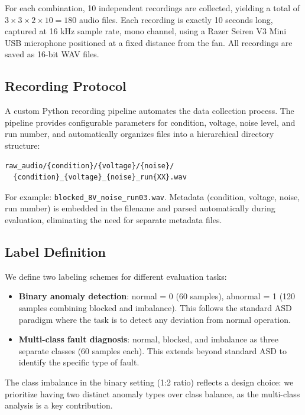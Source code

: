 \documentclass[sigconf]{acmart}
\begin{document}
For each combination, 10 independent recordings are collected, yielding a total of $3 \times 3 \times 2 \times 10 = 180$ audio files. Each recording is exactly 10 seconds long, captured at 16 kHz sample rate, mono channel, using a Razer Seiren V3 Mini USB microphone positioned at a fixed distance from the fan. All recordings are saved as 16-bit WAV files.

\subsection{Recording Protocol}

A custom Python recording pipeline automates the data collection process. The pipeline provides configurable parameters for condition, voltage, noise level, and run number, and automatically organizes files into a hierarchical directory structure:

\begin{verbatim}
raw_audio/{condition}/{voltage}/{noise}/
  {condition}_{voltage}_{noise}_run{XX}.wav
\end{verbatim}

For example: \texttt{blocked\_8V\_noise\_run03.wav}. Metadata (condition, voltage, noise, run number) is embedded in the filename and parsed automatically during evaluation, eliminating the need for separate metadata files.

\subsection{Label Definition}

We define two labeling schemes for different evaluation tasks:

\begin{itemize}
    \item \textbf{Binary anomaly detection}: normal = 0 (60 samples), abnormal = 1 (120 samples combining blocked and imbalance). This follows the standard ASD paradigm where the task is to detect any deviation from normal operation.
    \item \textbf{Multi-class fault diagnosis}: normal, blocked, and imbalance as three separate classes (60 samples each). This extends beyond standard ASD to identify the specific type of fault.
\end{itemize}

The class imbalance in the binary setting (1:2 ratio) reflects a design choice: we prioritize having two distinct anomaly types over class balance, as the multi-class analysis is a key contribution.
\end{document}
